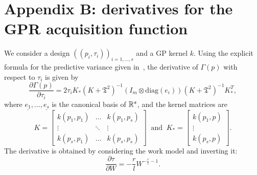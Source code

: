\section{Appendix B: derivatives for the GPR acquisition function}\label{app:derivatives} 
We consider a design $\left( (p_i,\tau_i)\right)_{i=1,\dots,s}$ and a GP kernel $k$. Using the explicit formula for the predictive variance given in~\cite[equation 2.24]{RasmussenWilliams2006}, the derivative of $\Gamma(p)$ with respect to $\tau_i$ is given by \[
    \frac{\partial \Gamma(p)}{\partial \tau_i} = 2\tau_i K_* (K + \mathfrak{T} ^2  )^{-1} (I_m \otimes \text{diag}(e_i))(K + \mathfrak{T} ^2  )^{-1} K_*^T,
\] 
where $\underline{e_1}, \dots,\underline{e_s}$ is the canonical basis of $\mathbb{R}^s$, and the kernel matrices are\[
K = \begin{bmatrix} k(p_1,p_1) & \dots & k(p_1,p_s) \\
    \vdots               & \ddots & \vdots \\
    k(p_s,p_1) & \dots & k(p_s,p_s)
\end{bmatrix} \ \text{ and } \
K_* =  \begin{bmatrix}
    k(p_1,p) \\
    \vdots \\
    k(p_s,p)
\end{bmatrix}.
\]
The derivative is obtained by considering the work model and inverting it:
\[
\frac{\partial \tau}{\partial W} = -\frac{r}{l} W^{-\frac{r}{l}-1}.
\]
